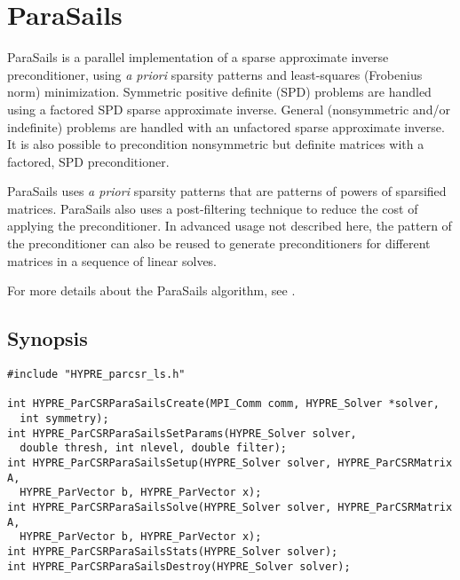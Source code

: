 \section{ParaSails}

ParaSails is a parallel implementation of a sparse approximate inverse
preconditioner, using {\em a priori} sparsity patterns and least-squares
(Frobenius norm) minimization.  Symmetric positive definite (SPD) problems
are handled using a factored SPD sparse approximate inverse.  General
(nonsymmetric and/or indefinite) problems are handled with an
unfactored sparse approximate inverse.  It is also possible to
precondition nonsymmetric but definite matrices with a factored, SPD
preconditioner.

ParaSails uses {\em a priori} sparsity patterns that are patterns of powers
of sparsified matrices.  ParaSails also uses a post-filtering technique
to reduce the cost of applying the preconditioner.  
In advanced usage not described here, the pattern of the
preconditioner can also be reused to generate preconditioners for different
matrices in a sequence of linear solves.

For more details about the ParaSails algorithm, see \cite{Chow:1999:APS}.

\subsection{Synopsis}

\begin{display}
\begin{verbatim}
#include "HYPRE_parcsr_ls.h"

int HYPRE_ParCSRParaSailsCreate(MPI_Comm comm, HYPRE_Solver *solver, 
  int symmetry);
int HYPRE_ParCSRParaSailsSetParams(HYPRE_Solver solver, 
  double thresh, int nlevel, double filter);
int HYPRE_ParCSRParaSailsSetup(HYPRE_Solver solver, HYPRE_ParCSRMatrix A,
  HYPRE_ParVector b, HYPRE_ParVector x);
int HYPRE_ParCSRParaSailsSolve(HYPRE_Solver solver, HYPRE_ParCSRMatrix A,
  HYPRE_ParVector b, HYPRE_ParVector x);
int HYPRE_ParCSRParaSailsStats(HYPRE_Solver solver);
int HYPRE_ParCSRParaSailsDestroy(HYPRE_Solver solver);
\end{verbatim}
\end{display}

